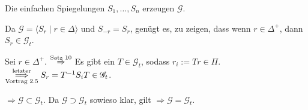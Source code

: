 \documentclass{handout}
\begin{document}
\begin{satz}
    Die einfachen Spiegelungen \( S_1, \ldots, S_n \) 
    erzeugen \( \mathscr{G} \).
\end{satz}
\begin{bew}
    Da \( \mathscr{G} = \langle S_r \;\vert\; r \in \Delta \rangle \) 
    und \( S_{-r} = S_r \), genügt es, zu zeigen, dass wenn 
    \( r\in \Delta^+ \), dann \( S_r \in \mathscr{G}_t \).

    Sei \( r \in \Delta^+ \). \( \overset{\text{Satz 10}}{\Rightarrow} \)
    Es gibt ein \( T \in \mathscr{G}_t \), sodass 
    \( r_i := Tr \in \Pi \).
    \( \overset{\text{letzter}}{\underset{\text{Vortrag 2.5}}{\Longrightarrow}} 
    S_r = T^{-1} S_i T \in \mathscr{G}_t \).
    
    \( \Rightarrow \mathscr{G} \subset \mathscr{G}_t \). 
    Da \( \mathscr{G} \supset \mathscr{G}_t \) sowieso klar, gilt
    \( \Rightarrow \mathscr{G} = \mathscr{G}_t \).
\end{bew}

\end{document}
